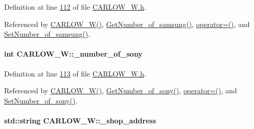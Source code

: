 Definition at line \hyperlink{_c_a_r_l_o_w___w_8h_source_l00112}{112} of file \hyperlink{_c_a_r_l_o_w___w_8h_source}{C\+A\+R\+L\+O\+W\+\_\+\+W.\+h}.



Referenced by \hyperlink{_c_a_r_l_o_w___w_8h_source_l00024}{C\+A\+R\+L\+O\+W\+\_\+\+W()}, \hyperlink{_c_a_r_l_o_w___w_8cpp_source_l00107}{Get\+Number\+\_\+of\+\_\+samsung()}, \hyperlink{_c_a_r_l_o_w___w_8h_source_l00075}{operator=()}, and \hyperlink{_c_a_r_l_o_w___w_8cpp_source_l00103}{Set\+Number\+\_\+of\+\_\+samsung()}.

\paragraph[{\texorpdfstring{\+\_\+number\+\_\+of\+\_\+sony}{_number_of_sony}}]{\setlength{\rightskip}{0pt plus 5cm}int C\+A\+R\+L\+O\+W\+\_\+\+W\+::\+\_\+number\+\_\+of\+\_\+sony\hspace{0.3cm}{\ttfamily [private]}}\hypertarget{class_c_a_r_l_o_w___w_a080de2e63290db84a0b9898682b74f6e_a080de2e63290db84a0b9898682b74f6e}{}\label{class_c_a_r_l_o_w___w_a080de2e63290db84a0b9898682b74f6e_a080de2e63290db84a0b9898682b74f6e}


Definition at line \hyperlink{_c_a_r_l_o_w___w_8h_source_l00113}{113} of file \hyperlink{_c_a_r_l_o_w___w_8h_source}{C\+A\+R\+L\+O\+W\+\_\+\+W.\+h}.



Referenced by \hyperlink{_c_a_r_l_o_w___w_8h_source_l00024}{C\+A\+R\+L\+O\+W\+\_\+\+W()}, \hyperlink{_c_a_r_l_o_w___w_8cpp_source_l00099}{Get\+Number\+\_\+of\+\_\+sony()}, \hyperlink{_c_a_r_l_o_w___w_8h_source_l00075}{operator=()}, and \hyperlink{_c_a_r_l_o_w___w_8cpp_source_l00095}{Set\+Number\+\_\+of\+\_\+sony()}.

\paragraph[{\texorpdfstring{\+\_\+shop\+\_\+address}{_shop_address}}]{\setlength{\rightskip}{0pt plus 5cm}std\+::string C\+A\+R\+L\+O\+W\+\_\+\+W\+::\+\_\+shop\+\_\+address\hspace{0.3cm}{\ttfamily [private]}}\hypertarget{class_c_a_r_l_o_w___w_acaa886b26f5a60d500f13709340d34cf_acaa886b26f5a60d500f13709340d34cf}{}\label{class_c_a_r_l_o_w___w_acaa886b26f5a60d500f13709340d34cf_acaa886b26f5a60d500f13709340d34cf}


